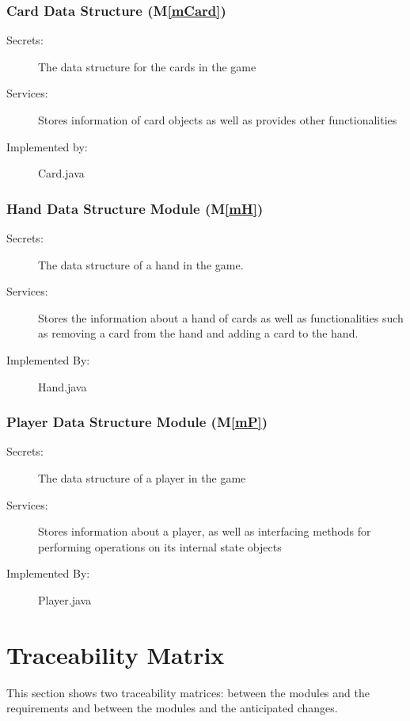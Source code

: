 \documentclass[12pt, titlepage]{article}
\newcommand{\mref}[1]{M\ref{#1}}
\begin{document}
\subsubsection{Card Data Structure (\mref{mCard})}
\begin{description}
    \item[Secrets:]The data structure for the cards in the game
    \item[Services:]Stores information of card objects as well as provides other functionalities
    \item [Implemented by:]Card.java
\end{description}

\subsubsection{Hand Data Structure Module (\mref{mH})}
\begin{description}
    \item[Secrets:] The data structure of a hand in the game.
    \item[Services:] Stores the information about a hand of cards as well as functionalities such as removing a card from the hand and adding a card to the hand.
    \item[Implemented By:] Hand.java
\end{description}


\subsubsection{Player Data Structure Module (\mref{mP})}
\begin{description}
    \item[Secrets:]The data structure of a player in the game
    \item[Services:]Stores information about a player, as well as interfacing methods for performing operations on its internal state objects
    \item[Implemented By:]Player.java
\end{description}

\section{Traceability Matrix} \label{SecTM}

This section shows two traceability matrices: between the modules and the
requirements and between the modules and the anticipated changes.
\end{document}

